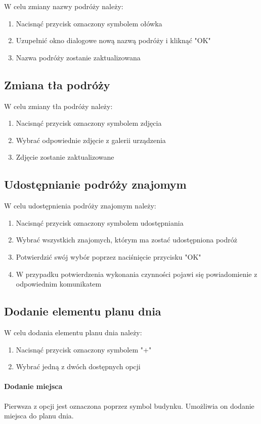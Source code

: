 \documentclass[10pt,twoside,a4paper]{report}
\begin{document}
W celu zmiany nazwy podróży należy:
\begin{enumerate}
\item Nacisnąć przycisk oznaczony symbolem ołówka
\item Uzupełnić okno dialogowe nową nazwą podróży i kliknąć "OK"
\item Nazwa podróży zostanie zaktualizowana
\end{enumerate}

\subsection{Zmiana tła podróży}

W celu zmiany tła podróży należy:
\begin{enumerate}
\item Nacisnąć przycisk oznaczony symbolem zdjęcia
\item Wybrać odpowiednie zdjęcie z galerii urządzenia
\item Zdjęcie zostanie zaktualizowane
\end{enumerate}

\subsection{Udostępnianie podróży znajomym}

W celu udostępnienia podróży znajomym należy:
\begin{enumerate}
\item Nacisnąć przycisk oznaczony symbolem udostępniania
\item Wybrać wszystkich znajomych, którym ma zostać udostępniona podróż
\item Potwierdzić swój wybór poprzez naciśnięcie przycisku "OK"
\item W przypadku potwierdzenia wykonania czynności pojawi się powiadomienie z odpowiednim komunikatem
\end{enumerate}

\subsection{Dodanie elementu planu dnia}
W celu dodania elementu planu dnia należy:
\begin{enumerate}
\item Nacisnąć przycisk oznaczony symbolem "+"
\item Wybrać jedną z dwóch dostępnych opcji
\end{enumerate}
\paragraph{Dodanie miejsca}
Pierwsza z opcji jest oznaczona poprzez symbol budynku.
Umożliwia on dodanie miejsca do planu dnia.
\end{document}
